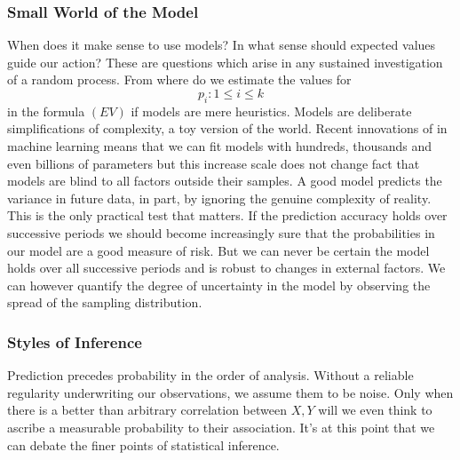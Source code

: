 \documentclass[10pt,a4paper,notitlepage, twocolumn]{article}
\begin{document}
\subsubsection*{Small World of the Model}
When does it make sense to use models? In what sense should expected values guide our action? These are questions which arise in any sustained investigation of a random process. From where do we estimate the values for $$p_{i} : 1 \leq i \leq k$$ in the formula $(EV)$ if models are mere heuristics. Models are deliberate simplifications of complexity, a toy version of the world. Recent innovations of in machine learning means that we can fit models with hundreds, thousands and even billions of parameters but this increase scale does not change fact that models are blind to all factors outside their samples. A good model predicts the variance in future data, in part, by ignoring the genuine complexity of reality.  This is the only practical test that matters. If the prediction accuracy holds over successive periods we should become increasingly sure that the probabilities in our model are a good measure of risk. But we can never be certain the model holds over all successive periods and is robust to changes in external factors. We can however quantify the degree of uncertainty in the model by observing the spread of the sampling distribution.

\subsubsection*{Styles of Inference}
Prediction precedes probability in the order of analysis. Without a reliable regularity underwriting our observations, we assume them to be noise. Only when there is a better than arbitrary correlation between $X, Y$ will we even think to ascribe a measurable probability to their association. It's at this point that we can debate the finer points of statistical inference.
\end{document}
